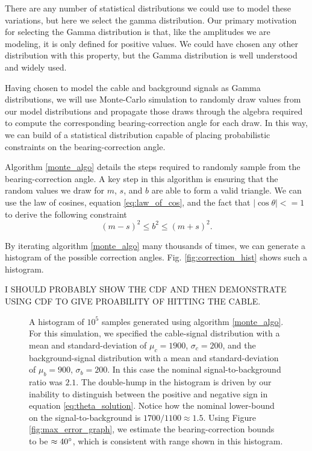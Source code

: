 \documentclass[paper=a4, fontsize=11pt]{scrartcl}
\numberwithin{equation}{section}		%
\numberwithin{figure}{section}			%
\numberwithin{table}{section}				%
\begin{document}
\begin{appendices}
There are any number of statistical distributions we could use to model these variations, but here we select the gamma distribution.  Our primary motivation for selecting the Gamma distribution is that, like the amplitudes we are modeling, it is only defined for positive values.  We could have chosen any other distribution with this property, but the Gamma distribution is well understood and widely used.

Having chosen to model the cable and background signals as Gamma distributions, we will use Monte-Carlo simulation to randomly draw values from our model distributions and propagate those draws through the algebra required to compute the corresponding bearing-correction angle for each draw.  In this way, we can build of a statistical distribution capable of placing probabilistic constraints on the bearing-correction angle.

Algorithm \ref{monte_algo} details the steps required to randomly sample from the bearing-correction angle.  A key step in this algorithm is ensuring that the random values we draw for $m$, $s$, and $b$ are able to form a valid triangle. We can use the law of cosines, equation \ref{eq:law_of_cos},  and the fact that $\left|\cos\theta\right| <=1$ to derive the following constraint
\begin{equation} \label{eq:bounds}
      \left(m-s\right)^2 \leq b ^ 2 \leq \left(m + s\right)^2.  
\end{equation}

By iterating algorithm \ref{monte_algo} many thousands of times, we can generate a histogram of the possible correction angles.  Fig. \ref{fig:correction_hist} shows such a histogram.  

I SHOULD PROBABLY SHOW THE CDF AND THEN DEMONSTRATE USING CDF TO GIVE PROABILITY OF HITTING THE CABLE.



\begin{figure}
  \caption{
  A histogram of $10^5$ samples generated using algorithm \ref{monte_algo}.  For this simulation, we specified the cable-signal distribution with a mean and standard-deviation of $\mu_c=1900$, $\sigma_c=200$, and the background-signal distribution with a mean and standard-deviation of $\mu_b=900$, $\sigma_b=200$.  In this case the nominal signal-to-background ratio was $2.1$.  The double-hump in the histogram is driven by our inability to distinguish between the positive and negative sign in equation \ref{eq:theta_solution}. Notice how the nominal lower-bound on the signal-to-background is $1700/1100 \approx 1.5$.  Using Figure \ref{fig:max_error_graph}, we estimate the bearing-correction bounds to be $\approx40\degree$, which is consistent with range shown in this histogram. 
  }


\end{figure}
\end{appendices}
\end{document}
